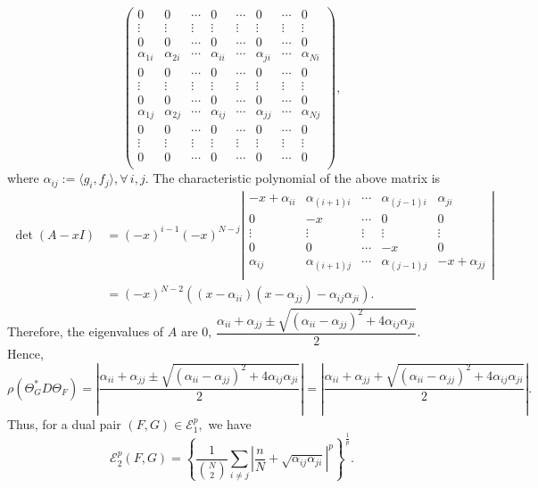\documentclass[final,1p,times]{elsarticle}
\begin{document}
	$$	\begin{pmatrix}
		0 & 0  & \cdots &0 & \cdots &0 & \cdots &0\\
		\vdots &\vdots  &\vdots &\vdots &\vdots&\vdots &\vdots &\vdots \\
		0 & 0  & \cdots &0 & \cdots &0 & \cdots &0 \\
		\alpha_{1i} & \alpha_{2i} & \cdots &\alpha_{ii} & \cdots &\alpha_{ji} & \cdots &\alpha_{Ni} \\
		0 & 0  & \cdots &0 & \cdots &0 & \cdots &0\\
		\vdots &\vdots  &\vdots &\vdots &\vdots&\vdots &\vdots &\vdots \\
		0 & 0  & \cdots &0 & \cdots &0 & \cdots &0 \\
		\alpha_{1j} & \alpha_{2j} & \cdots &\alpha_{ij} & \cdots &\alpha_{jj} & \cdots &\alpha_{Nj} \\
		0 & 0  & \cdots &0 & \cdots &0 & \cdots &0\\
		\vdots &\vdots  &\vdots &\vdots &\vdots&\vdots &\vdots &\vdots \\
		0 & 0  & \cdots &0 & \cdots &0 & \cdots &0 \\
	\end{pmatrix},$$
	where $\alpha_{ij}:= \langle g_i , f_j \rangle, \forall\,i,j. $
	\noindent
	The characteristic polynomial of the above matrix is
	\begin{align*}
		\det(A-xI) &= (-x)^{i-1}(-x)^{N-j} \left|\begin{array}{ccccccc}
			-x +  \alpha_{ii} &\alpha_{(i+1) i} &\cdots &\alpha_{(j-1)i} &\alpha_{ji}\\
			0 & -x  &\cdots& 0 &0\\
			\vdots &\vdots  &\vdots &\vdots &\vdots \\
			0 & 0  &\cdots& -x &0\\
			\alpha_{ij} & \alpha_{(i+1)j} & \cdots &\alpha_{(j-1)j} & -x + \alpha_{jj} \\
		\end{array}\right| \\ &= (-x)^{N-2} \left((x- \alpha_{ii})(x-\alpha_{jj}) -  \alpha_{ij} \alpha_{ji} \right).
	\end{align*}
	\noindent
	Therefore, the eigenvalues of $A$ are $0,\, \dfrac{ \alpha_{ii} + \alpha_{jj} \pm \sqrt{( \alpha_{ii}- \alpha_{jj})^2 + 4 \alpha_{ij} \alpha_{ji} }}{2}. $  Hence, $$ \rho( \Theta_{G}^*D\Theta_{F}) = \left| \frac{\alpha_{ii} + \alpha_{jj} \pm \sqrt{(\alpha_{ii} - \alpha_{jj})^2 + 4  \alpha_{ij}\alpha_{ji} }}{2} \right| = \left| \frac{\alpha_{ii} + \alpha_{jj} + \sqrt{(\alpha_{ii} - \alpha_{jj})^2 + 4 \alpha_{ij}\alpha_{ji} }}{2} \right|.$$ Thus, for a dual pair $(F,G) \in 	\mathcal{E}_{1}^p,$ we have
	\begin{equation} \label{eqn3point3}
		\mathcal{E}_{2}^p (F,G) = \left\{\frac{1}{\binom{N}{2}} \sum\limits_{i \neq j}\left|  \frac{n}{N} +  \sqrt{\alpha_{ij} \alpha_{ji}} \right|^p\right\}^{\frac{1}{p}} .
	\end{equation}
\end{document}
